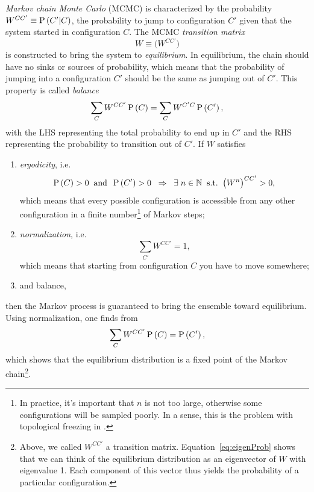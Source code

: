 {\it Markov chain Monte Carlo} (MCMC) is characterized by the probability 
$W^{CC'}\equiv\operatorname{P}\left(C'|C\right)$, the probability to jump to configuration 
$C'$ given that the system started in configuration $C$.
The MCMC {\it transition matrix}
\begin{equation}
  W\equiv\Big(W^{CC'}\Big)
\end{equation}
is constructed to bring the system to {\it equilibrium}.
In equilibrium, the chain should have no sinks or sources of probability,
which means that the probability of jumping into a configuration $C'$
should be the same as jumping out of $C'$. This property
is called {\it balance}
\begin{equation}\label{eq:balance}
    \sum\limits_CW^{CC'}\operatorname{P}\left(C\right)=
    \sum\limits_CW^{C'C}\operatorname{P}\left(C'\right),
\end{equation}
with the LHS representing the total probability to end up in $C'$ and
the RHS representing the probability to transition out of $C'$.
If $W$ satisfies
\begin{enumerate}
  \item {\it ergodicity}, i.e.
        \begin{equation}\label{eq:ergodicity}
          \operatorname{P}\left(C\right)>0\;\;\text{and}\;\;\operatorname{P}\left(C'\right)>0\;\;\Rightarrow\;\;
          \exists\;n\in\mathbb{N}\;\;\text{s.t.}\;\;\big(W^n\big)^{CC'}>0,
        \end{equation}
        which means that every possible configuration is accessible from
        any other configuration in a finite number\footnote{In practice,
        it's important that $n$ is not too large, otherwise some configurations
        will be sampled poorly. In a sense, this is the problem with
        topological freezing
        in .} of Markov steps;
  \item {\it normalization}, i.e.
        \begin{equation}
          \sum\limits_{C'}W^{CC'}=1,
        \end{equation}
        which means that starting from configuration $C$ you have
        to move somewhere;
  \item and balance, 
\end{enumerate}
then the Markov process is guaranteed to bring the ensemble toward 
equilibrium. Using normalization, one finds from 
\begin{equation}\label{eq:eigenProb}
    \sum\limits_CW^{CC'}\operatorname{P}\left(C\right)=\operatorname{P}\left(C'\right),
\end{equation}
which shows that the equilibrium distribution is a fixed point of
the Markov chain\footnote{Above, we called $W^{CC'}$ a transition matrix.
Equation~\eqref{eq:eigenProb} shows that we can think of the equilibrium
distribution as an eigenvector of $W$ with eigenvalue 1. Each component
of this vector thus yields the probability of a particular configuration.}. 

